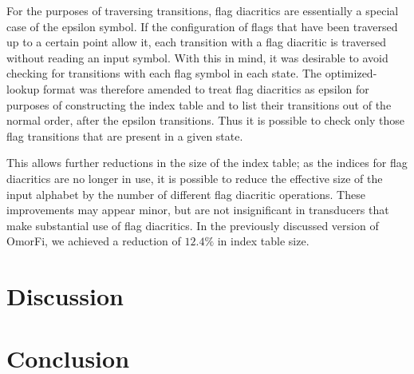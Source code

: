 \documentclass{llncs}
\begin{document}
For the purposes of traversing transitions, flag diacritics are essentially
a special case of the epsilon symbol. If the configuration of flags
that have been traversed up to a certain point allow it, each transition
with a flag diacritic is traversed without reading an input symbol. With
this in mind, it was desirable to avoid checking for transitions with each
flag symbol in each state. The optimized-lookup format was therefore amended
to treat flag diacritics as epsilon for purposes of constructing the index
table and to list their transitions out of the normal order, after the epsilon
transitions. Thus it is possible to check only those flag transitions that
are present in a given state.

This allows further reductions in the size of the index table; as
the indices for flag diacritics are no longer in use, it is possible to reduce
the effective size of the input alphabet by the number of different flag
diacritic operations. These improvements may appear minor, but are not
insignificant in transducers that make substantial use of flag diacritics. In
the previously discussed version of OmorFi, we achieved a reduction of $12.4\%$
in index table size.

\section{Discussion}

\section{Conclusion}

%
%
%



\end{document}
